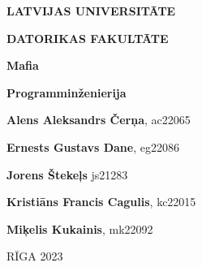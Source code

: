 \begin{titlepage}
    \thispagestyle{empty}
    \begin{center}
        \vspace*{2cm}
        \begin{large}\textbf{LATVIJAS UNIVERSITĀTE}

            \textbf{DATORIKAS FAKULTĀTE}

            \vfill
            \textbf{Mafia}
        \end{large}

        \vfill
        \textbf{Programminženierija}
    \end{center}
    \vspace{4cm}
    \begin{flushleft}
        \textbf{Alens Aleksandrs Čerņa}, ac22065

        \textbf{Ernests Gustavs Dane}, eg22086

        \textbf{Jorens Štekeļs} js21283

        \textbf{Kristiāns Francis Cagulis}, kc22015

        \textbf{Miķelis Kukainis}, mk22092
    \end{flushleft}
    \vspace{1cm}
    \begin{center}
        RĪGA 2023
    \end{center}
\end{titlepage}
